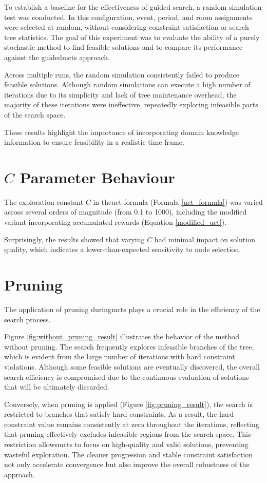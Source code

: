 To establish a baseline for the effectiveness of guided search, a random simulation test was conducted.  In this configuration, event, period, and room assignments were selected at random, without considering constraint satisfaction or search tree statistics. The goal of this experiment was to evaluate the ability of a purely stochastic method to find feasible solutions and to compare its performance against the guided\ac{mcts} approach. 

Across multiple runs, the random simulation consistently failed to produce feasible solutions. Although random simulations can execute a high number of iterations due to its simplicity and lack of tree maintenance overhead, the majority of these iterations were ineffective, repeatedly exploring infeasible parts of the search space. 

These results highlight the importance of incorporating domain knowledge information to ensure feasibility in a realistic time frame.

\section{\(C\) Parameter Behaviour}

The exploration constant \(C\) in the\ac{uct} formula (Formula \ref{uct_formula}) was varied across several orders of magnitude (from 0.1 to 1000), including the modified variant incorporating accumulated rewards (Equation \ref{modified_uct}). 

Surprisingly, the results showed that varying \(C\) had minimal impact on solution quality, which indicates a lower-than-expected sensitivity to node selection.

\section{Pruning}

The application of pruning during\ac{mcts} plays a crucial role in the efficiency of the search process.

Figure \ref{fig:without_pruning_result} illustrates the behavior of the method without pruning. The search frequently explores infeasible branches of the tree, which is evident from the large number of iterations with hard constraint violations. Although some feasible solutions are eventually discovered, the overall search efficiency is compromised due to the continuous evaluation of solutions that will be ultimately discarded.

Conversely, when pruning is applied (Figure \ref{fig:pruning_result}), the search is restricted to branches that satisfy hard constraints. As a result, the hard constraint value remains consistently at zero throughout the iterations, reflecting that pruning effectively excludes infeasible regions from the search space. This restriction allows\ac{mcts} to focus on high-quality and valid solutions, preventing wasteful exploration. The cleaner progression and stable constraint satisfaction not only accelerate convergence but also improve the overall robustness of the approach. 

